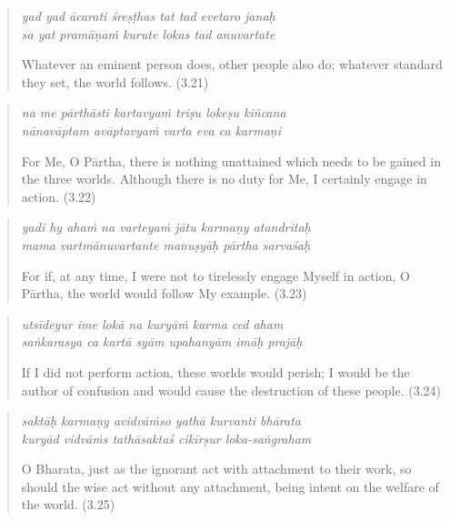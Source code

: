 \documentclass[12pt, twoside, openright]{memoir}
\begin{document}
\par
\begin{verse}
\textit{yad yad ācarati śreṣṭhas tat tad evetaro janaḥ} \\
\textit{sa yat pramāṇaṁ kurute lokas tad anuvartate}

\noindent Whatever an eminent person does, other people also do; whatever standard they set, the world follows. (3.21)
\end{verse}
\par



\par
\begin{verse}
\textit{na me pārthāsti kartavyaṁ triṣu lokeṣu kiñcana} \\
\textit{nānavāptam avāptavyaṁ varta eva ca karmaṇi}

\noindent For Me, O Pārtha, there is nothing unattained which needs to be gained in the three worlds. Although there is no duty for Me, I certainly engage in action. (3.22)
\end{verse}
\par



\par
\begin{verse}
\textit{yadi hy ahaṁ na varteyaṁ jātu karmaṇy atandritaḥ} \\
\textit{mama vartmānuvartante manuṣyāḥ pārtha sarvaśaḥ}

\noindent For if, at any time, I were not to tirelessly engage Myself in action, O Pārtha, the world would follow My example. (3.23)
\end{verse}
\par



\par
\begin{verse}
\textit{utsīdeyur ime lokā na kuryāṁ karma ced aham} \\
\textit{saṅkarasya ca kartā syām upahanyām imāḥ prajāḥ}

\noindent If I did not perform action, these worlds would perish; I would be the author of confusion and would cause the destruction of these people. (3.24)
\end{verse}
\par



\par
\begin{verse}
\textit{saktāḥ karmaṇy avidvāṁso yathā kurvanti bhārata} \\
\textit{kuryād vidvāṁs tathāsaktaś cikīrṣur loka-saṅgraham}

\noindent O Bharata, just as the ignorant act with attachment to their work, so should the wise act without any attachment, being intent on the welfare of the world. (3.25)
\end{verse}
\par
\end{document}
